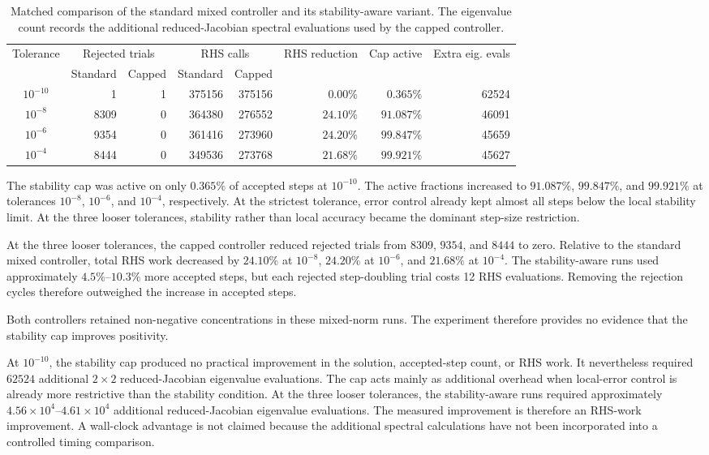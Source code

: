 \begin{table}[H]
\centering
\footnotesize
\caption{Matched comparison of the standard mixed controller and its stability-aware variant. The eigenvalue count records the additional reduced-Jacobian spectral evaluations used by the capped controller.}
\label{tab:stability-aware-rk4}
\begin{tabular}{crrrrrrr}
\toprule
Tolerance&\multicolumn{2}{c}{Rejected trials}&\multicolumn{2}{c}{RHS calls}&RHS reduction&Cap active&Extra eig. evals\\
&Standard&Capped&Standard&Capped&&&\\
\midrule
$10^{-10}$&1&1&375156&375156&$0.00\%$&$0.365\%$&62524\\
$10^{-8}$&8309&0&364380&276552&$24.10\%$&$91.087\%$&46091\\
$10^{-6}$&9354&0&361416&273960&$24.20\%$&$99.847\%$&45659\\
$10^{-4}$&8444&0&349536&273768&$21.68\%$&$99.921\%$&45627\\
\bottomrule
\end{tabular}
\end{table}

The stability cap was active on only $0.365\%$ of accepted steps at $10^{-10}$. The active fractions increased to $91.087\%$, $99.847\%$, and $99.921\%$ at tolerances $10^{-8}$, $10^{-6}$, and $10^{-4}$, respectively. At the strictest tolerance, error control already kept almost all steps below the local stability limit. At the three looser tolerances, stability rather than local accuracy became the dominant step-size restriction.

At the three looser tolerances, the capped controller reduced rejected trials from $8309$, $9354$, and $8444$ to zero. Relative to the standard mixed controller, total RHS work decreased by $24.10\%$ at $10^{-8}$, $24.20\%$ at $10^{-6}$, and $21.68\%$ at $10^{-4}$. The stability-aware runs used approximately $4.5\%$--$10.3\%$ more accepted steps, but each rejected step-doubling trial costs 12 RHS evaluations. Removing the rejection cycles therefore outweighed the increase in accepted steps.

Both controllers retained non-negative concentrations in these mixed-norm runs. The experiment therefore provides no evidence that the stability cap improves positivity.

At $10^{-10}$, the stability cap produced no practical improvement in the solution, accepted-step count, or RHS work. It nevertheless required $62524$ additional $2\times2$ reduced-Jacobian eigenvalue evaluations. The cap acts mainly as additional overhead when local-error control is already more restrictive than the stability condition. At the three looser tolerances, the stability-aware runs required approximately $4.56\times10^4$--$4.61\times10^4$ additional reduced-Jacobian eigenvalue evaluations. The measured improvement is therefore an RHS-work improvement. A wall-clock advantage is not claimed because the additional spectral calculations have not been incorporated into a controlled timing comparison.

